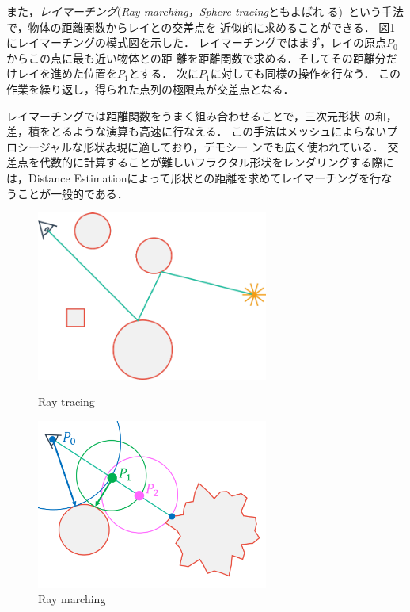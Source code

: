 また，\emph{レイマーチング}({\it Ray marching，Sphere tracing}ともよばれ
る)~\cite{hart1996sphere}という手法で，物体の距離関数からレイとの交差点を
近似的に求めることができる．
図\ref{fig:raymarch}にレイマーチングの模式図を示した．
レイマーチングではまず，レイの原点$P_0$からこの点に最も近い物体との距
離を距離関数で求める．そしてその距離分だけレイを進めた位置を$P_1$とする．
次に$P_1$に対しても同様の操作を行なう．
この作業を繰り返し，得られた点列の極限点が交差点となる．

レイマーチングでは距離関数をうまく組み合わせることで，三次元形状
の和，差，積をとるような演算も高速に行なえる．
この手法はメッシュによらないプロシージャルな形状表現に適しており，デモシー
ンでも広く使われている．
交差点を代数的に計算することが難しいフラクタル形状をレンダリングする際に
は，Distance Estimationによって形状との距離を求めてレイマーチングを行な
うことが一般的である．

 \begin{figure}[htbp]
  \begin{minipage}{0.5\hsize}
   \center
   \includegraphics[width=3in, keepaspectratio]{../img/fractal/raytrace.pdf}
   \caption{Ray tracing}
   \label{fig:raytrace}
  \end{minipage}
  \begin{minipage}{0.5\hsize}
   \center
   \includegraphics[width=3in, keepaspectratio]{../img/fractal/raymarching.pdf}
   \caption{Ray marching}
   \label{fig:raymarch}
  \end{minipage}
 \end{figure}

